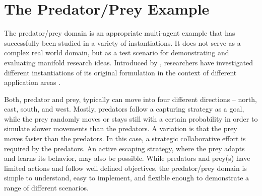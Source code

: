 \section{The Predator/Prey Example}
\label{section:the-predator-prey-example}

The predator/prey domain is an appropriate multi-agent example that has successfully been studied in a variety of instantiations. It does not serve as a complex real world domain, but as a test scenario for demonstrating and evaluating manifold research ideas. Introduced by \cite{BJD86}, researchers have investigated different instantiations of its original formulation in the context of different application areas \cite{SV00}. 

Both, predator and prey, typically can move into four different directions -- north, east, south, and west. Mostly, predators follow a capturing strategy as a goal, while the prey randomly moves or stays still with a certain probability in order to simulate slower movements than the predators. A variation is that the prey moves faster than the predators. In this case, a strategic collaborative effort is required by the predators. An active escaping strategy, where the prey adapts and learns its behavior, may also be possible.
While predators and prey(s) have limited actions and follow well defined objectives, the predator/prey domain is simple to understand, easy to implement, and flexible enough to demonstrate a range of different scenarios. %

